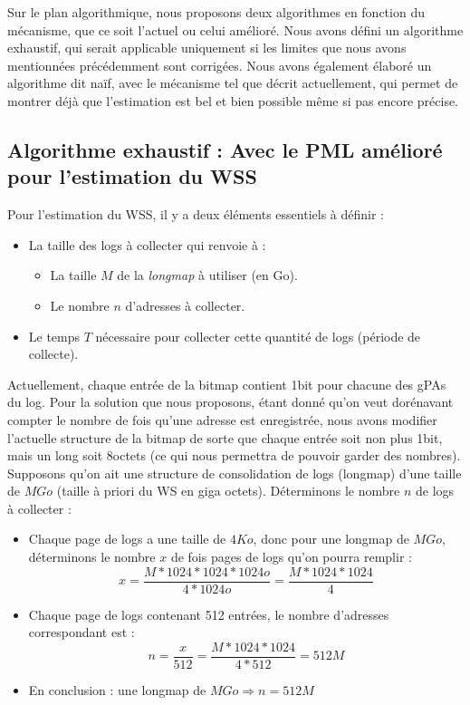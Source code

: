 Sur le plan algorithmique, nous proposons deux algorithmes en fonction du mécanisme, que ce soit l'actuel ou celui amélioré. Nous avons défini un algorithme exhaustif, qui serait applicable uniquement si les limites que nous avons mentionnées précédemment sont corrigées. Nous avons également élaboré un algorithme dit naïf, avec le mécanisme tel que décrit actuellement, qui permet de montrer déjà que l'estimation est bel et bien possible même si pas encore précise.

\subsection{Algorithme exhaustif : Avec le PML amélioré pour l'estimation du WSS}
Pour l'estimation du WSS, il y a deux éléments essentiels à définir :
\begin{itemize}
    \item La taille des logs à collecter qui renvoie à :
        \begin{itemize}[label=]
            \item La taille $M$ de la \textit{longmap} à utiliser (en Go).
            \item Le nombre $n$ d'adresses à collecter. 
        \end{itemize}
    \item Le temps $T$ nécessaire pour collecter cette quantité de logs (période de collecte).
\end{itemize}

\noindent Actuellement, chaque entrée de la bitmap contient 1bit pour chacune des gPAs du log. Pour la solution que nous proposons, étant donné qu'on veut dorénavant compter le nombre de fois qu'une adresse est enregistrée, nous avons modifier l'actuelle structure de la bitmap de sorte que chaque entrée soit non plus 1bit, mais un long soit 8octets (ce qui nous permettra de pouvoir garder des nombres).\\
Supposons qu'on ait une structure de consolidation de logs (longmap) d'une taille de $MGo$ (taille à priori du WS en giga octets). Déterminons le nombre $n$ de logs à collecter :
\begin{itemize}[label=]
    \item Chaque page de logs a une taille de $4Ko$, donc pour une longmap de $MGo$, déterminons le nombre $x$ de fois pages de logs qu'on pourra remplir : 
    $$x=\frac{M*1024*1024*1024o}{4*1024o}=\frac{M*1024*1024}{4}$$
    \item Chaque page de logs contenant 512 entrées, le nombre d'adresses correspondant est : 
    $$n=\frac{x}{512}=\frac{M*1024*1024}{4*512}=512M$$
    \item En conclusion : une longmap de $MGo \Rightarrow n=512M$ 
\end{itemize}

